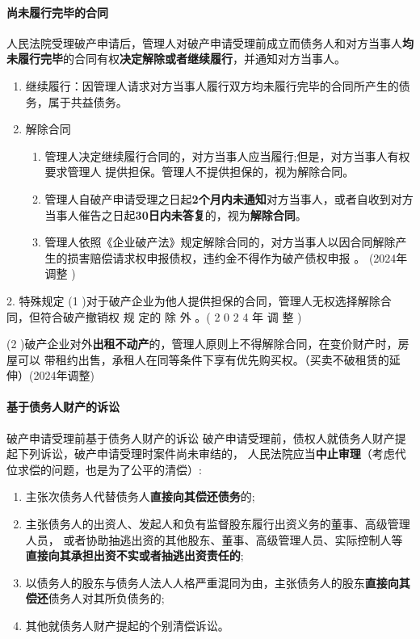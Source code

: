 \documentclass[UTF8,12pt]{ctexart}
\numberwithin{equation}{section} %
\numberwithin{figure}{section}
\numberwithin{table}{section}
\begin{document}
	\paragraph{尚未履行完毕的合同}
	人民法院受理破产申请后，管理人对破产申请受理前成立而债务人和对方当事人\textbf{均未履行完毕}的合同有权\textbf{决定解除或者继续履行}，并通知对方当事人。
	\begin{enumerate}
		\item 继续履行：因管理人请求对方当事人履行双方均未履行完毕的合同所产生的债务，属于共益债务。 
		
		\item 解除合同
		\begin{enumerate}
			\item 管理人决定继续履行合同的，对方当事人应当履行;但是，对方当事人有权要求管理人 提供担保。管理人不提供担保的，视为解除合同。
			
			\item 管理人自破产申请受理之日起\textbf{2个月内未通知}对方当事人，或者自收到对方当事人催告之日起\textbf{30日内未答复}的，视为\textbf{解除合同}。 
			
			\item 管理人依照《企业破产法》规定解除合同的，对方当事人以因合同解除产生的损害赔偿请求权申报债权，违约金不得作为破产债权申报 。 (2024年调整 )
		\end{enumerate}
		
	\end{enumerate}
	
	2. 特殊规定
	(1 )对于破产企业为他人提供担保的合同，管理人无权选择解除合同，但符合破产撤销权 规 定的 除 外 。( 2 0 2 4 年 调 整 )
	
	(2 )破产企业对外\textbf{出租不动产}的，管理人原则上不得解除合同，在变价财产时，房屋可以 带租约出售，承租人在同等条件下享有优先购买权。（买卖不破租赁的延伸）(2024年调整)
	
	\paragraph{基于债务人财产的诉讼}
	破产申请受理前基于债务人财产的诉讼 破产申请受理前，债权人就债务人财产提起下列诉讼，破产申请受理时案件尚未审结的， 人民法院应当\textbf{中止审理}（考虑代位求偿的问题，也是为了公平的清偿）:
	\begin{enumerate}
		\item 主张次债务人代替债务人\textbf{直接向其偿还债务}的;
		
		\item 主张债务人的出资人、发起人和负有监督股东履行出资义务的董事、高级管理人员， 或者协助抽逃出资的其他股东、董事、高级管理人员、实际控制人等\textbf{直接向其承担出资不实或者抽逃出资责任的}; 
		
		\item 以债务人的股东与债务人法人人格严重混同为由，主张债务人的股东\textbf{直接向其偿还}债务人对其所负债务的;
		
		\item 其他就债务人财产提起的个别清偿诉讼。
	\end{enumerate}
	
\end{document}
